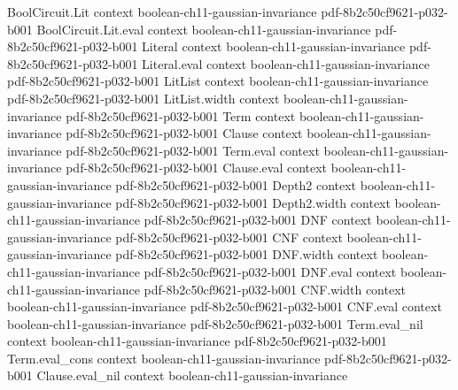 \begin{theorem}
\label{BooleanAnalysis.GaussianSpace.gaussian_logSobolev_gradient}
\leanok
{}
\proofstep
  {BoolCircuit.Lit}
  {context}
  {boolean-ch11-gaussian-invariance}
  {pdf-8b2c50cf9621-p032-b001}
\proofstep
  {BoolCircuit.Lit.eval}
  {context}
  {boolean-ch11-gaussian-invariance}
  {pdf-8b2c50cf9621-p032-b001}
\proofstep
  {Literal}
  {context}
  {boolean-ch11-gaussian-invariance}
  {pdf-8b2c50cf9621-p032-b001}
\proofstep
  {Literal.eval}
  {context}
  {boolean-ch11-gaussian-invariance}
  {pdf-8b2c50cf9621-p032-b001}
\proofstep
  {LitList}
  {context}
  {boolean-ch11-gaussian-invariance}
  {pdf-8b2c50cf9621-p032-b001}
\proofstep
  {LitList.width}
  {context}
  {boolean-ch11-gaussian-invariance}
  {pdf-8b2c50cf9621-p032-b001}
\proofstep
  {Term}
  {context}
  {boolean-ch11-gaussian-invariance}
  {pdf-8b2c50cf9621-p032-b001}
\proofstep
  {Clause}
  {context}
  {boolean-ch11-gaussian-invariance}
  {pdf-8b2c50cf9621-p032-b001}
\proofstep
  {Term.eval}
  {context}
  {boolean-ch11-gaussian-invariance}
  {pdf-8b2c50cf9621-p032-b001}
\proofstep
  {Clause.eval}
  {context}
  {boolean-ch11-gaussian-invariance}
  {pdf-8b2c50cf9621-p032-b001}
\proofstep
  {Depth2}
  {context}
  {boolean-ch11-gaussian-invariance}
  {pdf-8b2c50cf9621-p032-b001}
\proofstep
  {Depth2.width}
  {context}
  {boolean-ch11-gaussian-invariance}
  {pdf-8b2c50cf9621-p032-b001}
\proofstep
  {DNF}
  {context}
  {boolean-ch11-gaussian-invariance}
  {pdf-8b2c50cf9621-p032-b001}
\proofstep
  {CNF}
  {context}
  {boolean-ch11-gaussian-invariance}
  {pdf-8b2c50cf9621-p032-b001}
\proofstep
  {DNF.width}
  {context}
  {boolean-ch11-gaussian-invariance}
  {pdf-8b2c50cf9621-p032-b001}
\proofstep
  {DNF.eval}
  {context}
  {boolean-ch11-gaussian-invariance}
  {pdf-8b2c50cf9621-p032-b001}
\proofstep
  {CNF.width}
  {context}
  {boolean-ch11-gaussian-invariance}
  {pdf-8b2c50cf9621-p032-b001}
\proofstep
  {CNF.eval}
  {context}
  {boolean-ch11-gaussian-invariance}
  {pdf-8b2c50cf9621-p032-b001}
\proofstep
  {Term.eval_nil}
  {context}
  {boolean-ch11-gaussian-invariance}
  {pdf-8b2c50cf9621-p032-b001}
\proofstep
  {Term.eval_cons}
  {context}
  {boolean-ch11-gaussian-invariance}
  {pdf-8b2c50cf9621-p032-b001}
\proofstep
  {Clause.eval_nil}
  {context}
  {boolean-ch11-gaussian-invariance}

\end{theorem}
